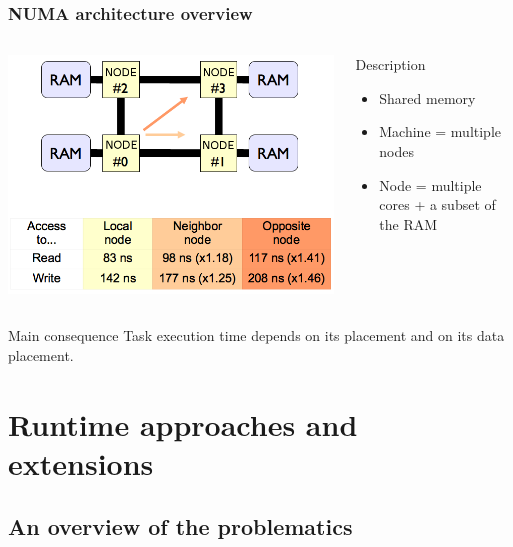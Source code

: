\documentclass[xcolor={usenames,dvipsnames,svgnames,table}, aspectratio=43]{beamer}
\begin{document}
\begin{frame}
\frametitle{NUMA architecture overview}
\begin{columns}[T,onlytextwidth]
  \includegraphics[scale=0.3]{graph/NUMA-latences}

  \begin{block}{Description}
    \begin{itemize}
      \item Shared memory
      \item Machine = multiple nodes
      \item Node = multiple cores + a subset of the RAM
    \end{itemize}
  \end{block}

\end{columns}
\begin{alertblock}{Main consequence}
  Task execution time depends on its placement and on its data placement.
\end{alertblock}

\end{frame}

\section{Runtime approaches and extensions}

\subsection{An overview of the problematics}
\end{document}
